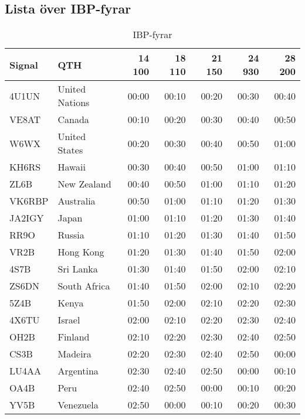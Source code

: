 \subsection{Lista över IBP-fyrar}

\begin{table}[H]
\centering
\begin{tabular}{llrrrrr}
\textbf{Signal} & \textbf{QTH} & \textbf{14 100} & \textbf{18 110} &
                \textbf{21 150} & \textbf{24 930} & \textbf{28 200} \\ \hline

4U1UN  & United Nations & 00:00  & 00:10  & 00:20  & 00:30  & 00:40  \\
VE8AT  & Canada         & 00:10  & 00:20  & 00:30  & 00:40  & 00:50  \\
W6WX   & United States  & 00:20  & 00:30  & 00:40  & 00:50  & 01:00  \\
KH6RS  & Hawaii         & 00:30  & 00:40  & 00:50  & 01:00  & 01:10  \\
ZL6B   & New Zealand    & 00:40  & 00:50  & 01:00  & 01:10  & 01:20  \\
VK6RBP & Australia      & 00:50  & 01:00  & 01:10  & 01:20  & 01:30  \\
JA2IGY & Japan          & 01:00  & 01:10  & 01:20  & 01:30  & 01:40  \\
RR9O   & Russia         & 01:10  & 01:20  & 01:30  & 01:40  & 01:50  \\
VR2B   & Hong Kong      & 01:20  & 01:30  & 01:40  & 01:50  & 02:00  \\
4S7B   & Sri Lanka      & 01:30  & 01:40  & 01:50  & 02:00  & 02:10  \\
ZS6DN  & South Africa   & 01:40  & 01:50  & 02:00  & 02:10  & 02:20  \\
5Z4B   & Kenya          & 01:50  & 02:00  & 02:10  & 02:20  & 02:30  \\
4X6TU  & Israel         & 02:00  & 02:10  & 02:20  & 02:30  & 02:40  \\
OH2B   & Finland        & 02:10  & 02:20  & 02:30  & 02:40  & 02:50  \\
CS3B   & Madeira        & 02:20  & 02:30  & 02:40  & 02:50  & 00:00  \\
LU4AA  & Argentina      & 02:30  & 02:40  & 02:50  & 00:00  & 00:10  \\
OA4B   & Peru           & 02:40  & 02:50  & 00:00  & 00:10  & 00:20  \\
YV5B   & Venezuela      & 02:50  & 00:00  & 00:10  & 00:20  & 00:30  \\
\end{tabular}
\caption{IBP-fyrar}
\end{table}

